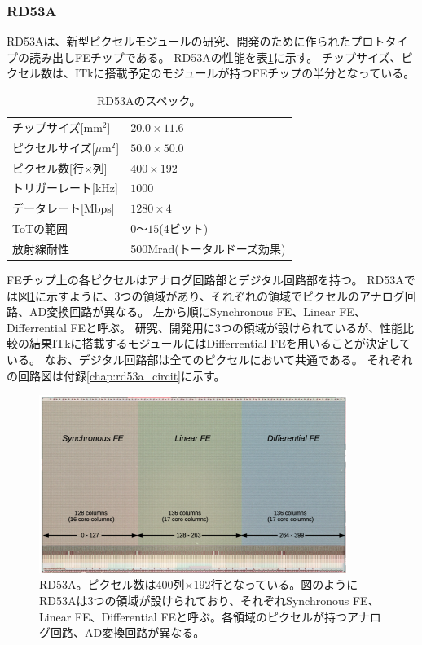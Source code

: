 \subsubsection{RD53A}
RD53A\cite{2-1}は、新型ピクセルモジュールの研究、開発のために作られたプロトタイプの読み出しFEチップである。
RD53Aの性能を表\ref{rd53a_spec}に示す。
チップサイズ、ピクセル数は、ITkに搭載予定のモジュールが持つFEチップの半分となっている。

\begin{table}[tbp]
\begin{center}
\caption[RD53Aのスペック]{RD53Aのスペック。}
\label{rd53a_spec}
  \begin{tabular}{|ll|} \hline
    チップサイズ[mm$^2$] & $20.0\times 11.6$ \\ 
    ピクセルサイズ[$\mu$m$^2$] & $50.0\times 50.0$ \\ 
    ピクセル数[行$\times$列] & $400\times 192$ \\ 
    トリガーレート[kHz] & $1000$ \\ 
    データレート[Mbps] & $1280\times4$ \\ 
    ToTの範囲 & $0〜15$(4ビット) \\
    放射線耐性 & 500Mrad(トータルドーズ効果\cite{2-4}) \\
  \end{tabular}
\end{center}
\end{table}

FEチップ上の各ピクセルはアナログ回路部とデジタル回路部を持つ。
RD53Aでは図\ref{fechip_rd53a}に示すように、3つの領域があり、それぞれの領域でピクセルのアナログ回路、AD変換回路が異なる。
左から順にSynchronous FE、Linear FE、Differrential FEと呼ぶ。
研究、開発用に3つの領域が設けられているが、性能比較の結果ITkに搭載するモジュールにはDifferrential FEを用いることが決定している。
なお、デジタル回路部は全てのピクセルにおいて共通である。
それぞれの回路図は付録\ref{chap:rd53a_circit}に示す。

\begin{figure}[bpt]\centering
\includegraphics[width=10cm]{fechip_rd53a}
\caption[RD53A]{RD53A\cite{2-1}。ピクセル数は400列$\times$192行となっている。図のようにRD53Aは3つの領域が設けられており、それぞれSynchronous FE、Linear FE、Differential FEと呼ぶ。各領域のピクセルが持つアナログ回路、AD変換回路が異なる。}
\label{fechip_rd53a}
\end{figure}


